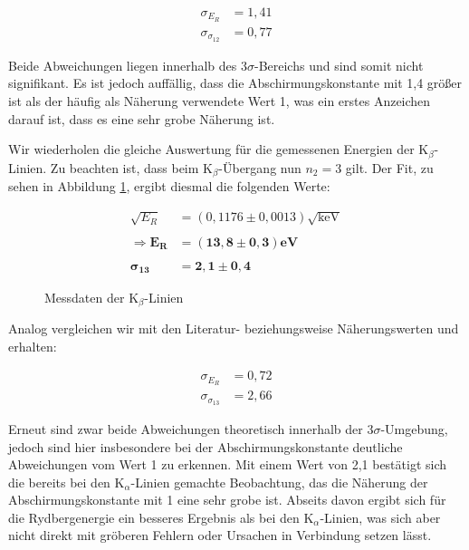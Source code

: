 \documentclass{article}
\begin{document}
\begin{equation}
    \begin{split}
        \sigma_{E_R} &= 1,41 \\
        \sigma_{\sigma_{12}} &= 0,77
    \end{split}
\end{equation}

Beide Abweichungen liegen innerhalb des $3\sigma$-Bereichs und sind somit nicht signifikant. Es ist jedoch auffällig, dass die Abschirmungskonstante mit 1,4 größer ist als der häufig als Näherung verwendete Wert 1, was ein erstes Anzeichen darauf ist, dass es eine sehr grobe Näherung ist.  

Wir wiederholen die gleiche Auswertung für die gemessenen Energien der K$_\beta$-Linien. Zu beachten ist, dass beim K$_\beta$-Übergang nun $n_2 = 3$ gilt. Der Fit, zu sehen in Abbildung \ref{fig:Kb_Plot}, ergibt diesmal die folgenden Werte:

\begin{equation}
    \begin{split}
        \sqrt{E_R} &= (0,1176 \pm 0,0013) \sqrt{\text{keV}} \\ \\
        \Rightarrow \bm{E_R} &\bm{= (13,8 \pm 0,3)} \textbf{eV} \\ \\
        \bm{\sigma_{13}} &\bm{= 2,1 \pm 0,4}
    \end{split}
\end{equation}

\begin{figure}[!h]
    \centering
    \caption{Messdaten der K$_\beta$-Linien}
    \label{fig:Kb_Plot}
\end{figure}

\newpage
Analog vergleichen wir mit den Literatur- beziehungsweise Näherungswerten und erhalten:

\begin{equation}
    \begin{split}
        \sigma_{E_R} &= 0,72 \\
        \sigma_{\sigma_{13}} &= 2,66
    \end{split}
\end{equation}

Erneut sind zwar beide Abweichungen theoretisch innerhalb der $3\sigma$-Umgebung, jedoch sind hier insbesondere bei der Abschirmungskonstante deutliche Abweichungen vom Wert 1 zu erkennen. Mit einem Wert von 2,1 bestätigt sich die bereits bei den K$_\alpha$-Linien gemachte Beobachtung, das die Näherung der Abschirmungskonstante mit 1 eine sehr grobe ist. Abseits davon ergibt sich für die Rydbergenergie ein besseres Ergebnis als bei den K$_\alpha$-Linien, was sich aber nicht direkt mit gröberen Fehlern oder Ursachen in Verbindung setzen lässt. 
\end{document}
